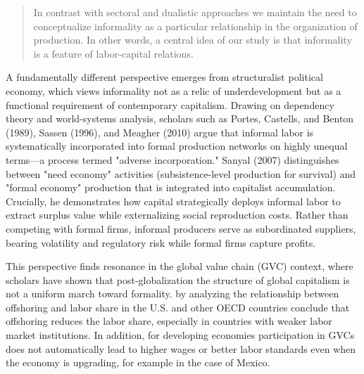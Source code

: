 \begin{quote}
	In contrast with sectoral and dualistic approaches we maintain the need to conceptualize informality as a particular relationship in the organization of production. In other words, a central idea of our study is that informality is a feature of labor-capital relations. \parencite[pp. 78--79]{Fortuna1989}
\end{quote}

A fundamentally different perspective emerges from structuralist political economy, which views informality not as a relic of underdevelopment but as a functional requirement of contemporary capitalism. Drawing on dependency theory and world-systems analysis, scholars such as Portes, Castells, and Benton (1989), Sassen (1996), and Meagher (2010) argue that informal labor is systematically incorporated into formal production networks on highly unequal terms—a process termed "adverse incorporation." Sanyal (2007) distinguishes between  "need economy" activities (subsistence-level production for survival) and "formal economy" production that is integrated into capitalist accumulation. Crucially, he demonstrates how capital strategically deploys informal labor to extract surplus value while externalizing social reproduction costs. Rather than competing with formal firms, informal producers serve as subordinated suppliers, bearing volatility and regulatory risk while formal firms capture profits.

This perspective finds resonance in the global value chain (GVC) context, where scholars have shown that post-globalization the structure of global capitalism is not a uniform march toward formality. \textcite{milbergwinkler} by analyzing the relationship between offshoring and labor share in the U.S. and other OECD countries conclude that offshoring reduces the labor share, especially in countries with weaker labor market institutions. In addition, for developing economies participation in GVCs does not automatically lead to higher wages or better labor standards even when the economy is upgrading, for example in the case of Mexico. 

